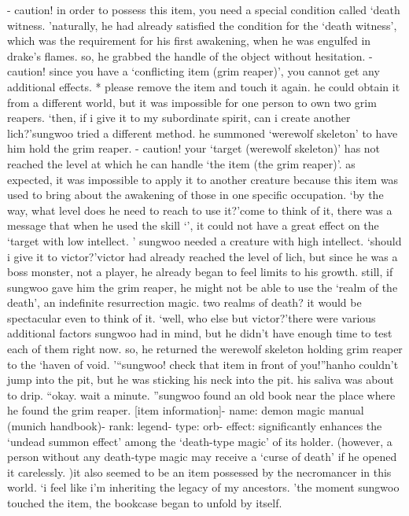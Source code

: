 - caution! in order to possess this item, you need a special condition called ‘death witness.
’naturally, he had already satisfied the condition for the ‘death witness’, which was the requirement for his first awakening, when he was engulfed in drake’s flames.
so, he grabbed the handle of the object without hesitation.
- caution! since you have a ‘conflicting item (grim reaper)’, you cannot get any additional effects.
* please remove the item and touch it again.
he could obtain it from a different world, but it was impossible for one person to own two grim reapers.
‘then, if i give it to my subordinate spirit, can i create another lich?’sungwoo tried a different method.
 he summoned ‘werewolf skeleton’ to have him hold the grim reaper.
- caution! your ‘target (werewolf skeleton)’ has not reached the level at which he can handle ‘the item (the grim reaper)’.
as expected, it was impossible to apply it to another creature because this item was used to bring about the awakening of those in one specific occupation.
‘by the way, what level does he need to reach to use it?’come to think of it, there was a message that when he used the skill ‘’, it could not have a great effect on the ‘target with low intellect.
’
sungwoo needed a creature with high intellect.
‘should i give it to victor?’victor had already reached the level of lich, but since he was a boss monster, not a player, he already began to feel limits to his growth.
still, if sungwoo gave him the grim reaper, he might not be able to use the ‘realm of the death’, an indefinite resurrection magic.
 two realms of death? it would be spectacular even to think of it.
‘well, who else but victor?’there were various additional factors sungwoo had in mind, but he didn’t have enough time to test each of them right now.
so, he returned the werewolf skeleton holding grim reaper to the ‘haven of void.
’“sungwoo! check that item in front of you!”hanho couldn’t jump into the pit, but he was sticking his neck into the pit.
 his saliva was about to drip.
“okay.
 wait a minute.
”sungwoo found an old book near the place where he found the grim reaper.
[item information]- name: demon magic manual (munich handbook)- rank: legend- type: orb- effect: significantly enhances the ‘undead summon effect’ among the ‘death-type magic’ of its holder.
 (however, a person without any death-type magic may receive a ‘curse of death’ if he opened it carelessly.
)it also seemed to be an item possessed by the necromancer in this world.
‘i feel like i’m inheriting the legacy of my ancestors.
’the moment sungwoo touched the item, the bookcase began to unfold by itself.
